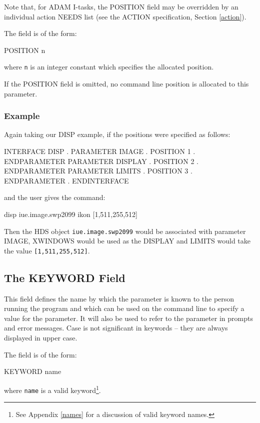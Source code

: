 \documentclass[twoside,11pt,nolof]{starlink}
\begin{document}
Note that, for ADAM I-tasks, the POSITION field may be overridden by an
individual action NEEDS list (see the ACTION specification, Section
\ref{action}).

The field is of the form:
\begin{terminalv}
POSITION n
\end{terminalv}
where \texttt{n} is an integer constant which specifies the allocated position.

If the POSITION field is omitted, no command line position is allocated to this
parameter.

\subsubsection*{Example}
Again taking our DISP example, if the positions were specified as follows:
\begin{terminalv}
INTERFACE DISP
         .
   PARAMETER IMAGE
         .
      POSITION 1
         .
   ENDPARAMETER
   PARAMETER DISPLAY
         .
      POSITION 2
         .
   ENDPARAMETER
   PARAMETER LIMITS
         .
      POSITION 3
         .
   ENDPARAMETER
      .
ENDINTERFACE
\end{terminalv}
and the user gives the command:
\begin{terminalv}
disp iue.image.swp2099 ikon [1,511,255,512]
\end{terminalv}
Then the HDS object \texttt{iue.image.swp2099} would be associated with parameter
IMAGE, XWINDOWS would be used as the DISPLAY and LIMITS would take the value
\texttt{[1,511,255,512]}.

\subsection{The KEYWORD Field}

This field defines the name by which the parameter is known to
the person running the program and which can be used on the command line to
specify a value for the parameter. It will also be used to refer to the
parameter in prompts and error messages. Case is not significant in keywords --
they are always displayed in upper case.

The field is of the form:
\begin{terminalv}
KEYWORD  name
\end{terminalv}
where \texttt{name} is a valid keyword\footnote{See Appendix \ref{names} for a
discussion of valid keyword names.}.
\end{document}
